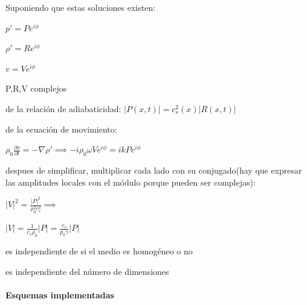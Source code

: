 \documentclass{article}
\begin{document}
\begin{description}  
\item Suponiendo que estas soluciones existen:
\item $p\prime = P e^{i\phi}$
\item $\rho\prime = R e^{i\phi}$
\item $v = V e^{i\phi}$
\item P,R,V  complejos
\item de la relación de adiabaticidad: $|P(x,t)| = c_s^{2}(x) |R(x,t)|$
\item de la ecuación de movimiento: 
\item $\rho_0 \frac{\partial v}{\partial t} = -\nabla \rho\prime \implies -i \rho_0 \omega V e^{i\phi} = i k P e^{i\phi}$
\item despues de simplificar,  multiplicar cada lado con su conjugado(hay que expresar las amplitudes locales con el módulo porque pueden ser complejas):
\item  $|V|^2 = \frac{|P|^2}{\rho_0^{2} c_s^2} \implies$ 
\item $|V|= \frac{1}{c_s \rho_0} |P| = \frac{c_s}{p_0 \gamma} |P|$ 

\item es independiente de si el medio es homogéneo o no 
\item es independiente del número de dimensiones

\end{description}  

\newpage


\paragraph{Esquemas implementadas}  
\end{document}
